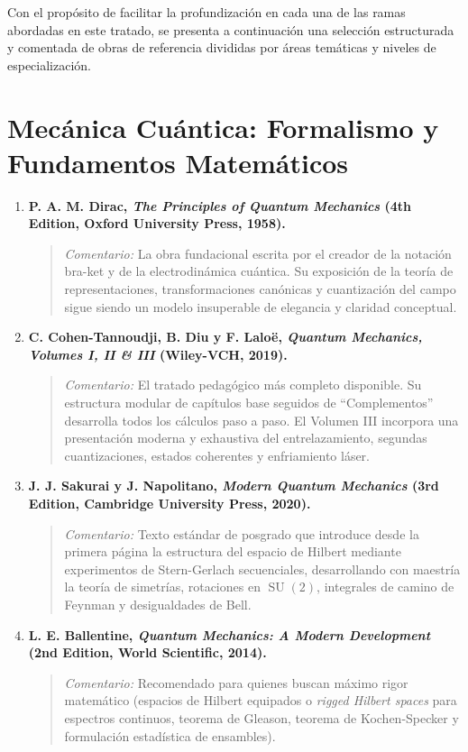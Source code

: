 \documentclass[11pt,a4paper,twoside]{report}
\theoremstyle{definition}
\theoremstyle{plain}
\theoremstyle{remark}
\begin{document}
Con el propósito de facilitar la profundización en cada una de las ramas abordadas en este tratado, se presenta a continuación una selección estructurada y comentada de obras de referencia divididas por áreas temáticas y niveles de especialización.

\section{Mecánica Cuántica: Formalismo y Fundamentos Matemáticos}

\begin{enumerate}
    \item \textbf{P. A. M. Dirac, \textit{The Principles of Quantum Mechanics} (4th Edition, Oxford University Press, 1958).}
    \begin{quote}
        \textit{Comentario:} La obra fundacional escrita por el creador de la notación bra-ket y de la electrodinámica cuántica. Su exposición de la teoría de representaciones, transformaciones canónicas y cuantización del campo sigue siendo un modelo insuperable de elegancia y claridad conceptual.
    \end{quote}

    \item \textbf{C. Cohen-Tannoudji, B. Diu y F. Laloë, \textit{Quantum Mechanics, Volumes I, II \& III} (Wiley-VCH, 2019).}
    \begin{quote}
        \textit{Comentario:} El tratado pedagógico más completo disponible. Su estructura modular de capítulos base seguidos de ``Complementos'' desarrolla todos los cálculos paso a paso. El Volumen III incorpora una presentación moderna y exhaustiva del entrelazamiento, segundas cuantizaciones, estados coherentes y enfriamiento láser.
    \end{quote}

    \item \textbf{J. J. Sakurai y J. Napolitano, \textit{Modern Quantum Mechanics} (3rd Edition, Cambridge University Press, 2020).}
    \begin{quote}
        \textit{Comentario:} Texto estándar de posgrado que introduce desde la primera página la estructura del espacio de Hilbert mediante experimentos de Stern-Gerlach secuenciales, desarrollando con maestría la teoría de simetrías, rotaciones en $\operatorname{SU}(2)$, integrales de camino de Feynman y desigualdades de Bell.
    \end{quote}

    \item \textbf{L. E. Ballentine, \textit{Quantum Mechanics: A Modern Development} (2nd Edition, World Scientific, 2014).}
    \begin{quote}
        \textit{Comentario:} Recomendado para quienes buscan máximo rigor matemático (espacios de Hilbert equipados o \textit{rigged Hilbert spaces} para espectros continuos, teorema de Gleason, teorema de Kochen-Specker y formulación estadística de ensambles).
    \end{quote}


\end{enumerate}
\end{document}
